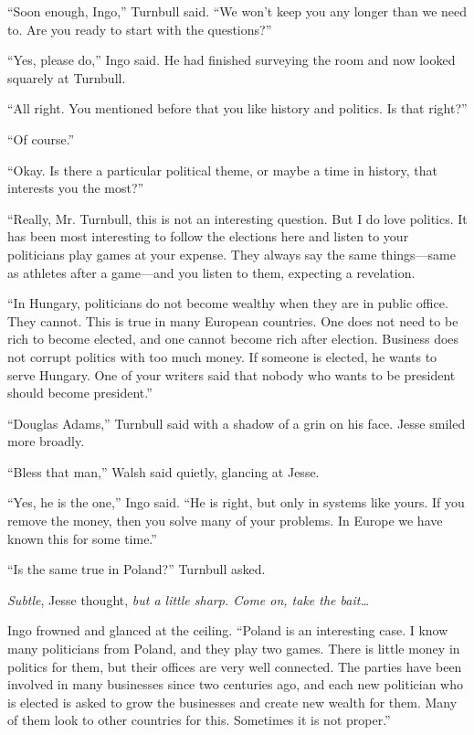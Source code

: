 \documentclass[12pt]{book}
\begin{document}
``Soon enough, Ingo,'' Turnbull said.  ``We won't keep you any longer than we need to.  Are you ready to start with the questions?''

``Yes, please do,'' Ingo said.  He had finished surveying the room and now looked squarely at Turnbull.

``All right.  You mentioned before that you like history and politics.  Is that right?''

``Of course.''

``Okay.  Is there a particular political theme, or maybe a time in history, that interests you the most?''

``Really, Mr. Turnbull, this is not an interesting question.  But I do love politics.  It has been most interesting to follow the elections here and listen to your politicians play games at your expense.  They always say the same things---same as athletes after a game---and you listen to them, expecting a revelation.

``In Hungary, politicians do not become wealthy when they are in public office.  They cannot.  This is true in many European countries.  One does not need to be rich to become elected, and one cannot become rich after election.  Business does not corrupt politics with too much money.  If someone is elected, he wants to serve Hungary.  One of your writers said that nobody who wants to be president should become president.''

``Douglas Adams,'' Turnbull said with a shadow of a grin on his face.  Jesse smiled more broadly.

``Bless that man,'' Walsh said quietly, glancing at Jesse.

``Yes, he is the one,'' Ingo said.  ``He is right, but only in systems like yours.  If you remove the money, then you solve many of your problems.  In Europe we have known this for some time.''

``Is the same true in Poland?'' Turnbull asked.

\emph{Subtle}, Jesse thought, \emph{but a little sharp.  Come on, take the bait\dots}

Ingo frowned and glanced at the ceiling.  ``Poland is an interesting case.  I know many politicians from Poland, and they play two games.  There is little money in politics for them, but their offices are very well connected.  The parties have been involved in many businesses since two centuries ago, and each new politician who is elected is asked to grow the businesses and create new wealth for them.  Many of them look to other countries for this.  Sometimes it is not proper.''
\end{document}
